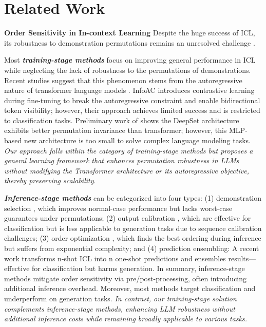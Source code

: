 \section{Related Work}
\textbf{Order Sensitivity in In-context Learning} 
Despite the huge success of ICL, its robustness to demonstration permutations remains an unresolved challenge 
\citep{pmlr-v139-zhao21c}.

Most \textbf{\textit{training-stage methods}} focus on improving general performance in ICL \citep{min-etal-2022-metaicl, wei-etal-2023-symbol} while neglecting the lack of robustness to the permutations of demonstrations. Recent studies suggest that this phenomenon stems from the autoregressive nature of transformer language models \citep{chen2023positionalinformationmattersinvariant,xiang-etal-2024-addressing}.
InfoAC \citep{xiang-etal-2024-addressing} introduces contrastive learning during fine-tuning to break the autoregressive constraint and enable bidirectional token visibility; however, their approach achieves limited success and is restricted to classification tasks. Preliminary work of \citet{chen2023positionalinformationmattersinvariant} shows the DeepSet architecture exhibits better permutation invariance than transformer; however, this MLP-based new architecture is too small to solve complex language modeling tasks.
\textit{Our approach falls within the category of training-stage methods but proposes a general learning framework that enhances permutation robustness in LLMs without modifying the Transformer architecture or its autoregressive objective, thereby preserving scalability}.

\textbf{\textit{Inference-stage methods}} can be categorized into four types: 
(1) demonstration selection \citep{chang2023datacurationstabilizeincontext, peng-etal-2024-revisiting}, 
which improves normal-case performance but lacks worst-case guarantees under permutations; 
(2) output calibration \citep{pmlr-v139-zhao21c, li-etal-2023-distinguishability, guo-etal-2024-makes}, which are effective for classification but is less applicable to generation tasks due to sequence calibration challenges; (3) order optimization \citep{lu-etal-2022-fantastically}, which finds the best ordering during inference but suffers from exponential complexity; and (4) prediction ensembling: 
A recent work \citep{zhang-etal-2024-batch} transforms n-shot ICL into n one-shot predictions and ensembles results—effective for classification but harms generation.
In summary, inference-stage methods mitigate order sensitivity via pre/post-processing, often introducing additional inference overhead. Moreover, most methods target classification and underperform on generation tasks.
\textit{In contrast, our training-stage solution complements inference-stage methods, enhancing LLM robustness without additional inference costs while remaining broadly applicable to various tasks.}



